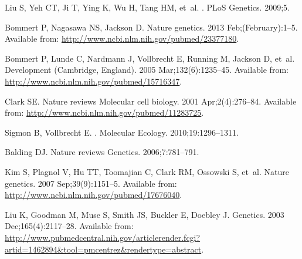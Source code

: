 \documentclass[10pt,letterpaper]{article}
\begin{document}
\begin{thebibliography}{10}
Liu S, Yeh CT, Ji T, Ying K, Wu H, Tang HM, et~al.
.
\newblock PLoS Genetics. 2009;5.

Bommert P, Nagasawa NS, Jackson D.
\newblock Nature genetics. 2013 Feb;(February):1--5.
\newblock Available from: \url{http://www.ncbi.nlm.nih.gov/pubmed/23377180}.

Bommert P, Lunde C, Nardmann J, Vollbrecht E, Running M, Jackson D, et~al.
\newblock Development (Cambridge, England). 2005 Mar;132(6):1235--45.
\newblock Available from: \url{http://www.ncbi.nlm.nih.gov/pubmed/15716347}.

Clark SE.
\newblock Nature reviews Molecular cell biology. 2001 Apr;2(4):276--84.
\newblock Available from: \url{http://www.ncbi.nlm.nih.gov/pubmed/11283725}.

Sigmon B, Vollbrecht E.
.
\newblock Molecular Ecology. 2010;19:1296--1311.

Balding DJ.
\newblock Nature reviews Genetics. 2006;7:781--791.

Kim S, Plagnol V, Hu TT, Toomajian C, Clark RM, Ossowski S, et~al.
\newblock Nature genetics. 2007 Sep;39(9):1151--5.
\newblock Available from: \url{http://www.ncbi.nlm.nih.gov/pubmed/17676040}.

Liu K, Goodman M, Muse S, Smith JS, Buckler E, Doebley J.
\newblock Genetics. 2003 Dec;165(4):2117--28.
\newblock Available from:
  \url{http://www.pubmedcentral.nih.gov/articlerender.fcgi?artid=1462894\&tool=pmcentrez\&rendertype=abstract}.

\end{thebibliography}
\end{document}
